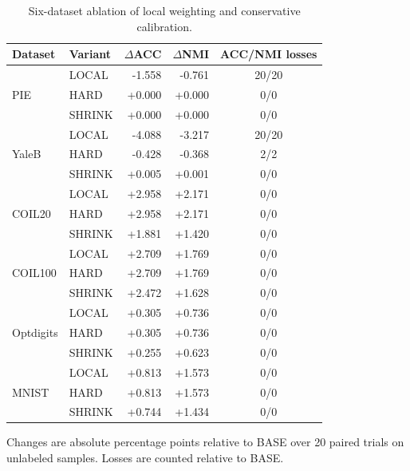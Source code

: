 \begin{table}[t]
\centering
\caption{Six-dataset ablation of local weighting and conservative calibration.}\label{tab:ablation6}
\small
\begin{tabular}{llrrc}
\toprule
Dataset & Variant & $\Delta$ACC & $\Delta$NMI & ACC/NMI losses \\
\midrule
\multirow{3}{*}{PIE} & LOCAL & -1.558 & -0.761 & 20/20 \\
& HARD & +0.000 & +0.000 & 0/0 \\
& SHRINK & +0.000 & +0.000 & 0/0 \\
\midrule
\multirow{3}{*}{YaleB} & LOCAL & -4.088 & -3.217 & 20/20 \\
& HARD & -0.428 & -0.368 & 2/2 \\
& SHRINK & +0.005 & +0.001 & 0/0 \\
\midrule
\multirow{3}{*}{COIL20} & LOCAL & +2.958 & +2.171 & 0/0 \\
& HARD & +2.958 & +2.171 & 0/0 \\
& SHRINK & +1.881 & +1.420 & 0/0 \\
\midrule
\multirow{3}{*}{COIL100} & LOCAL & +2.709 & +1.769 & 0/0 \\
& HARD & +2.709 & +1.769 & 0/0 \\
& SHRINK & +2.472 & +1.628 & 0/0 \\
\midrule
\multirow{3}{*}{Optdigits} & LOCAL & +0.305 & +0.736 & 0/0 \\
& HARD & +0.305 & +0.736 & 0/0 \\
& SHRINK & +0.255 & +0.623 & 0/0 \\
\midrule
\multirow{3}{*}{MNIST} & LOCAL & +0.813 & +1.573 & 0/0 \\
& HARD & +0.813 & +1.573 & 0/0 \\
& SHRINK & +0.744 & +1.434 & 0/0 \\
\bottomrule
\end{tabular}

\vspace{1mm}
\parbox{0.98\textwidth}{\footnotesize
Changes are absolute percentage points relative to BASE over 20 paired trials on unlabeled samples. Losses are counted relative to BASE.}
\end{table}
